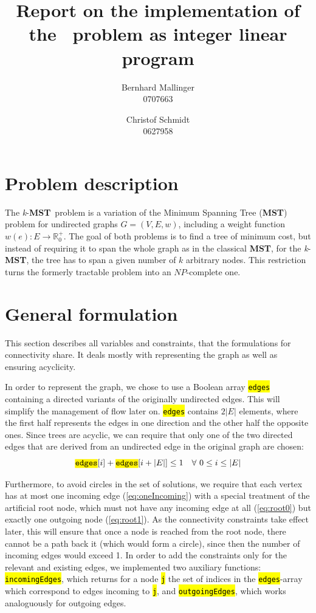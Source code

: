 \documentclass[,%
			paper=a4,%
			DIV14,
			liststotoc,
			bibtotoc,
			draft=false,%
			numbers=noendperiod
			]{scrartcl}
\title{Report on the implementation of the \kmst\ problem as integer linear program}
\author{Bernhard Mallinger \\ 0707663 \and Christof Schmidt \\ 0627958}
\newcommand{\mst}{\textbf{MST}}
\newcommand{\kmst}{\textit{k}-\mst}
\newcommand{\ilc}[1]{\hl{\texttt{#1}}} %
\begin{document}
\maketitle

\section{Problem description}

The \kmst\ problem is a variation of the Minimum Spanning Tree (\mst) problem for undirected graphs $G = (V, E, w)$, including a weight function $w(e) : E \rightarrow \mathbb{R}^+_0$.
The goal of both problems is to find a tree of minimum cost, but instead of requiring it to span the whole graph as in the classical \mst, for the \kmst, the tree has to span a given number of $k$ arbitrary nodes.
This restriction turns the formerly tractable problem into an $NP$-complete one.

\section{General formulation}

This section describes all variables and constraints, that the formulations for connectivity share. It deals mostly with representing the graph as well as ensuring acyclicity.

In order to represent the graph, we chose to use a Boolean array \ilc{edges} containing a directed variants of the originally undirected edges.
This will simplify the management of flow later on.
\ilc{edges} contains $2|E|$ elements, where the first half represents the edges in one direction and the other half the opposite ones.
Since trees are acyclic, we can require that only one of the two directed edges that are derived from an undirected edge in the original graph are chosen:
\begin{equation}
 \ilc{edges}[i] + \ilc{edges}[i + |E|] \leq 1\quad\forall~0\leq i \leq |E|
\end{equation}

Furthermore, to avoid circles in the set of solutions, we require that each vertex has at most one incoming edge (\eqref{eq:oneIncoming}) with a special treatment of the artificial root node, which must not have any incoming edge at all (\eqref{eq:root0}) but exactly one outgoing node (\eqref{eq:root1}). 
As the connectivity constraints take effect later, this will ensure that once a node is reached from the root node, there cannot be a path back it (which would form a circle), since then the number of incoming edges would exceed 1.
In order to add the constraints only for the relevant and existing edges, we implemented two auxiliary functions: \ilc{incomingEdges}, which returns for a node \ilc{j} the set of indices in the \ilc{edges}-array which correspond to edges incoming to \ilc{j}, and \ilc{outgoingEdges}, which works analoguously for outgoing edges.
\end{document}
